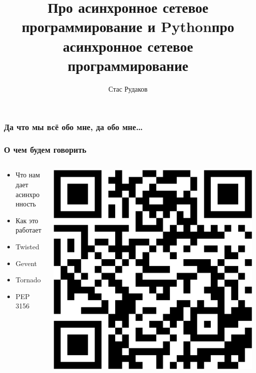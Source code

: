 \documentclass[aspectratio=169]{beamer}
\begin{document}
\title{Про асинхронное сетевое программирование и Python}
\author{Стас Рудаков}
\date{}

{
\title{про асинхронное сетевое программирование}
\titleframe
}


\begin{frame}
  \frametitle{Да что мы всё обо мне, да обо мне\ldots}
\end{frame}


\begin{frame}
  \frametitle{О чем будем говорить}
  \begin{columns}
    \begin{column}{.5\textwidth}
      \begin{itemize}
        \item Что нам дает асинхронность
        \item Как это работает
        \item Twisted
        \item Gevent
        \item Tornado
        \item PEP 3156
      \end{itemize}
    \end{column}

    \hfill

    \begin{column}{.3\textwidth}
      \includegraphics[scale=0.08]{img/qrcode.png}
    \end{column}
  \end{columns}


\end{frame}
\end{document}
